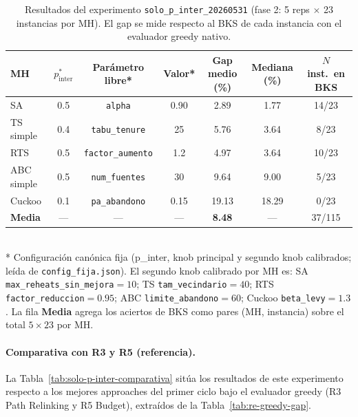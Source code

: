 \begin{table}[h]
\centering
\caption{Resultados del experimento \texttt{solo\_p\_inter\_20260531}
         (fase 2: 5 reps $\times$ 23 instancias por MH). El gap se mide
         respecto al BKS de cada instancia con el evaluador greedy nativo.}
\label{tab:solo-p-inter-resultados}
\small
\begin{tabular}{lcccccc}
\toprule
MH & $p_{\text{inter}}^*$ & Parámetro libre* & Valor* &
  Gap medio (\%) & Mediana (\%) & $N$ inst.\ en BKS \\
\midrule
SA           & 0.5 & \texttt{alpha}          & 0.90 &
  2.89  & 1.77  & 14/23 \\
TS simple    & 0.4 & \texttt{tabu\_tenure}   & 25   &
  5.76  & 3.64  & 8/23 \\
RTS          & 0.5 & \texttt{factor\_aumento}& 1.2  &
  4.97  & 3.64  & 10/23 \\
ABC simple   & 0.5 & \texttt{num\_fuentes}   & 30   &
  9.64  & 9.00  & 5/23 \\
Cuckoo       & 0.1 & \texttt{pa\_abandono}   & 0.15 &
  19.13 & 18.29 & 0/23 \\
\midrule
\textbf{Media} & --- & --- & --- & \textbf{8.48} & --- & 37/115 \\
\bottomrule
\end{tabular}
\\[4pt]
\footnotesize
* Configuración canónica fija (p\_inter, knob principal y segundo knob
calibrados; leída de \texttt{config\_fija.json}). El segundo knob calibrado por
MH es: SA \texttt{max\_reheats\_sin\_mejora}$=10$; TS
\texttt{tam\_vecindario}$=40$; RTS \texttt{factor\_reduccion}$=0.95$; ABC
\texttt{limite\_abandono}$=60$; Cuckoo \texttt{beta\_levy}$=1.3$. La fila
\textbf{Media} agrega los aciertos de BKS como pares (MH, instancia) sobre el
total $5 \times 23$ por MH.
\end{table}

\paragraph{Comparativa con R3 y R5 (referencia).}
La Tabla~\ref{tab:solo-p-inter-comparativa} sitúa los resultados de
este experimento respecto a los mejores approaches del primer ciclo
bajo el evaluador greedy (R3 Path Relinking y R5 Budget), extraídos
de la Tabla~\ref{tab:re-greedy-gap}.

